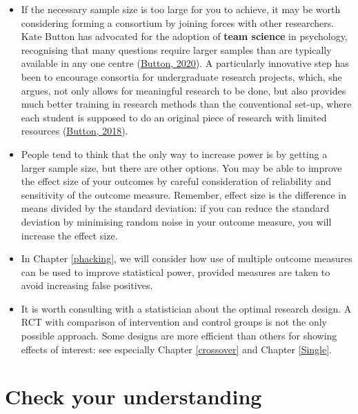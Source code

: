 \documentclass{krantz}
\providecommand{\tightlist}{%
\setlength{\itemsep}{0pt}\setlength{\parskip}{0pt}}
\begin{document}
\begin{itemize}
\tightlist
\item
  If the necessary sample size is too large for you to achieve, it may be worth considering forming a consortium by joining forces with other researchers. Kate Button has advocated for the adoption of \textbf{team science} in psychology, recognising that many questions require larger samples than are typically available in any one centre (\protect\hyperlink{ref-button2020}{Button, 2020}). A particularly innovative step has been to encourage consortia for undergraduate research projects, which, she argues, not only allows for meaningful research to be done, but also provides much better training in research methods than the conventional set-up, where each student is supposed to do an original piece of research with limited resources (\protect\hyperlink{ref-button2018}{Button, 2018}).\\
\item
  People tend to think that the only way to increase power is by getting a larger sample size, but there are other options. You may be able to improve the effect size of your outcomes by careful consideration of reliability and sensitivity of the outcome measure. Remember, effect size is the difference in means divided by the standard deviation: if you can reduce the standard deviation by minimising random noise in your outcome measure, you will increase the effect size.\\
\item
  In Chapter \ref{phacking}, we will consider how use of multiple outcome measures can be used to improve statistical power, provided measures are taken to avoid increasing false positives.\\
\item
  It is worth consulting with a statistician about the optimal research design. A RCT with comparison of intervention and control groups is not the only possible approach. Some designs are more efficient than others for showing effects of interest: see especially Chapter \ref{crossover} and Chapter \ref{Single}.
\end{itemize}

\hypertarget{check-your-understanding-12}{%
\section{Check your understanding}\label{check-your-understanding-12}}
\end{document}
